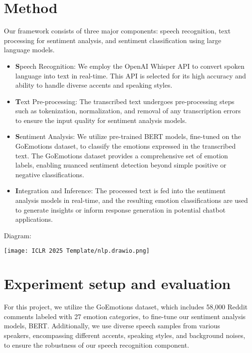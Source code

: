 \documentclass{article} %
\begin{document}
\section{Method}
Our framework consists of three major components: speech recognition, text processing for sentiment analysis, and sentiment classification using large language models.

\begin{itemize}
\item \textbf Speech Recognition: We employ the OpenAI Whisper API to convert spoken language into text in real-time. This API is selected for its high accuracy and ability to handle diverse accents and speaking styles.

\item \textbf Text Pre-processing: The transcribed text undergoes pre-processing steps such as tokenization, normalization, and removal of any transcription errors to ensure the input quality for sentiment analysis models.

\item \textbf Sentiment Analysis: We utilize pre-trained BERT models, fine-tuned on the GoEmotions dataset, to classify the emotions expressed in the transcribed text. The GoEmotions dataset provides a comprehensive set of emotion labels, enabling nuanced sentiment detection beyond simple positive or negative classifications.

\item \textbf Integration and Inference: The processed text is fed into the sentiment analysis models in real-time, and the resulting emotion classifications are used to generate insights or inform response generation in potential chatbot applications.

\end{itemize}
Diagram:

\texttt{[image: ICLR 2025 Template/nlp.drawio.png]}

\newpage
\section{Experiment setup and evaluation}
For this project, we utilize the GoEmotions dataset, which includes 58,000 Reddit comments labeled with 27 emotion categories, to fine-tune our sentiment analysis models, BERT. Additionally, we use diverse speech samples from various speakers, encompassing different accents, speaking styles, and background noises, to ensure the robustness of our speech recognition component.
\end{document}
